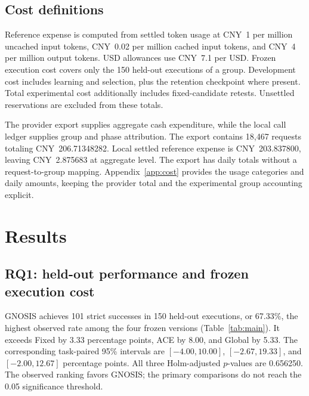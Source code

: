 \documentclass{ecai}
\begin{document}
\subsection{Cost definitions}

Reference expense is computed from settled token usage at CNY~1 per million uncached input tokens, CNY~0.02 per million cached input tokens, and CNY~4 per million output tokens. USD allowances use CNY~7.1 per USD. Frozen execution cost covers only the 150 held-out executions of a group. Development cost includes learning and selection, plus the retention checkpoint where present. Total experimental cost additionally includes fixed-candidate retests. Unsettled reservations are excluded from these totals.

The provider export supplies aggregate cash expenditure, while the local call ledger supplies group and phase attribution. The export contains 18,467 requests totaling CNY~206.71348282. Local settled reference expense is CNY~203.837800, leaving CNY~2.875683 at aggregate level. The export has daily totals without a request-to-group mapping. Appendix~\ref{app:cost} provides the usage categories and daily amounts, keeping the provider total and the experimental group accounting explicit.

\section{Results}
\label{sec:results}

\subsection{RQ1: held-out performance and frozen execution cost}

GNOSIS achieves 101 strict successes in 150 held-out executions, or 67.33\%, the highest observed rate among the four frozen versions (Table~\ref{tab:main}). It exceeds Fixed by 3.33 percentage points, ACE by 8.00, and Global by 5.33. The corresponding task-paired 95\% intervals are $[-4.00,10.00]$, $[-2.67,19.33]$, and $[-2.00,12.67]$ percentage points. All three Holm-adjusted $p$-values are 0.656250. The observed ranking favors GNOSIS; the primary comparisons do not reach the 0.05 significance threshold.
\end{document}

